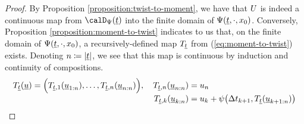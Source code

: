 \begin{proof}
  \label{proof:theorem:mgf-fdds}
  By Proposition \ref{proposition:twist-to-moment}, we have that $U$ is indeed a continuous map from $\momentSpace(\underline t)$ into the finite domain of $\Psi(\underline t, \cdot, x_0)$.
  Conversely, Proposition \ref{proposition:moment-to-twist} indicates to us that, on the finite domain of $\Psi(\underline t, \cdot, x_0)$, a recursively-defined map $T_{\underline t}$ from (\ref{eq:moment-to-twist}) exists.
  Denoting $n \coloneqq |\underline t|$, we see that this map is continuous by induction and continuity of compositions.
  \begin{equation*}
    T_{\underline t}(\underline{u}) = \Big( T_{\underline t, 1}(\underline{u}_{1:n}), \ldots, T_{\underline t, n}(\underline{u}_{n:n}) \Big),  \quad
    \begin{aligned}[t]
      T_{\underline t,n}(\underline{u}_{n:n}) &= u_n \\
      T_{\underline t,k}(\underline{u}_{k:n}) &= u_k + \psi\big(\Delta t_{k+1}, T_{\underline t}(\underline{u}_{k+1:n}) \big)
    \end{aligned}
  \end{equation*}


\end{proof}
